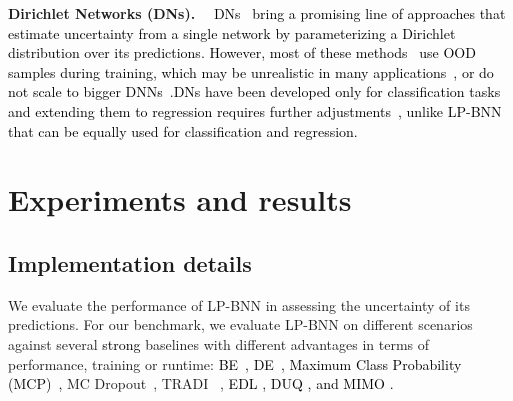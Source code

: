 \documentclass[10pt,twocolumn,letterpaper]{article}
\newcommand\Gianni{\textcolor{black}}
\newcommand{\ab}[1]{\textcolor{black}{#1}}
\newcommand{\abc}[1]{\textcolor{violet}{[AB: \em #1]}}
\newcommand{\parag}[1]{\smallskip\noindent\textbf{#1}~~}
\newcommand{\method}{LP-BNN\xspace}
\begin{document}
\parag{Dirichlet Networks (DNs).} 
\ab{DNs~\cite{malinin2018predictive,malinin2019reverse,sensoy2018evidential, charpentier2020posterior,tsiligkaridis2021information} bring a promising line of approaches that estimate uncertainty from a single network by parameterizing a Dirichlet distribution over its predictions. However, most of these methods~\cite{malinin2018predictive, malinin2019reverse} use OOD samples during training, which may be unrealistic in many applications~\cite{charpentier2020posterior}, or do not scale to bigger DNNs~\cite{joo2020being}.DNs have been developed only for classification tasks and extending them to regression requires further adjustments~\cite{malinin2020regression}, unlike \method that can be equally used for classification and regression.}







\begin{comment}


\abc{Plan:
\begin{itemize}
    \item BNNs from old to new
    \item Ensembles and pseudo-ensembles ( swag+swa+temporal per gaussian pertubation +tradi + ovnni+)
\item Other works using Bayesian ideas for uncertainty: DUQ, Prior Networks, last-layer approaches, etc.
\end{itemize}
Take away message: BNNs are nice but rather impractical. There are several approaches for uncertainty quantification but Deep Ensembles are still on top since they have very good predictive uncertainty and diversity. We go for more scalable BNNs that would enable performance close do Deep Ensembles but with better parameter-efficiency.
} 
\end{comment} 

\section{Experiments and results}\label{section:experiments}


\subsection{Implementation details}
We {evaluate} the performance of LP-BNN in assessing  {the uncertainty of its predictions.} 
For our benchmark, we evaluate \method on different scenarios against several 
\ab{strong} baselines with different advantages in terms of performance, training or runtime: \ab{BE~\cite{wen2020batchensemble}, DE~\cite{lakshminarayanan2017simple}, Maximum Class Probability (MCP)~\cite{hendrycks2016baseline},} MC Dropout~\cite{gal2016dropout}, TRADI~ \cite{franchi2019tradi}, \Gianni{EDL \cite{sensoy2018evidential}, DUQ \cite{van2020uncertainty}, and MIMO \cite{havasi2020training}.} 
\end{document}
